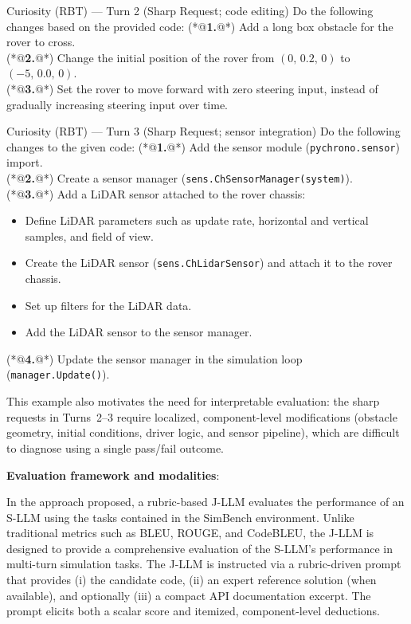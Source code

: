 \documentclass{ieeeaccess}
\newcommand{\noindentBold}[1]{\par\noindent\textbf{#1}}
\begin{document}
    \begin{PromptBlock}{Curiosity (RBT) --- Turn 2 (Sharp Request; code editing)}
    Do the following changes based on the provided code:
    (*@\textbf{1.}@*) Add a long box obstacle for the rover to cross.\\
    (*@\textbf{2.}@*) Change the initial position of the rover from $(0,\,0.2,\,0)$ to $(-5,\,0.0,\,0)$.\\
    (*@\textbf{3.}@*) Set the rover to move forward with zero steering input, instead of gradually increasing steering input over time.
    \end{PromptBlock}
    
    \begin{PromptBlock}{Curiosity (RBT) --- Turn 3 (Sharp Request; sensor integration)}
    Do the following changes to the given code:
    (*@\textbf{1.}@*) Add the sensor module (\texttt{pychrono.sensor}) import.\\
    (*@\textbf{2.}@*) Create a sensor manager (\texttt{sens.ChSensorManager(system)}).\\
    (*@\textbf{3.}@*) Add a LiDAR sensor attached to the rover chassis:
    \begin{itemize}
      \item Define LiDAR parameters such as update rate, horizontal and vertical samples, and field of view.
      \item Create the LiDAR sensor (\texttt{sens.ChLidarSensor}) and attach it to the rover chassis.
      \item Set up filters for the LiDAR data.
      \item Add the LiDAR sensor to the sensor manager.
    \end{itemize}
    (*@\textbf{4.}@*) Update the sensor manager in the simulation loop (\texttt{manager.Update()}).
    \end{PromptBlock}
    
    
\noindent This example also motivates the need for interpretable evaluation: the sharp requests in Turns~2--3 require localized, component-level modifications (obstacle geometry, initial conditions, driver logic, and sensor pipeline), which are difficult to diagnose using a single pass/fail outcome.

\medskip

{\noindentBold{Evaluation framework and modalities}:}
\label{sec:modalities} In the approach proposed, a rubric-based J-LLM evaluates the performance of an S-LLM using the tasks contained in the SimBench environment. Unlike traditional metrics such as BLEU, ROUGE, and CodeBLEU, the J-LLM is designed to provide a comprehensive evaluation of the S-LLM's performance in multi-turn simulation tasks. The J-LLM is instructed via a rubric-driven prompt that provides (i) the candidate code, 
(ii) an expert reference solution (when available), and optionally (iii) a compact API documentation excerpt.
The prompt elicits both a scalar score and itemized, component-level deductions.
\end{document}
